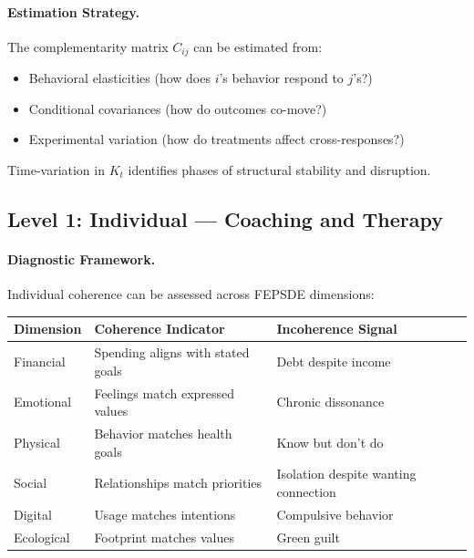 \documentclass[12pt,a4paper]{article}
\begin{document}
\paragraph{Estimation Strategy.}
The complementarity matrix $C_{ij}$ can be estimated from:
\begin{itemize}
  \item Behavioral elasticities (how does $i$'s behavior respond to $j$'s?)
  \item Conditional covariances (how do outcomes co-move?)
  \item Experimental variation (how do treatments affect cross-responses?)
\end{itemize}

Time-variation in $K_t$ identifies phases of structural stability and disruption.

\subsection{Level 1: Individual --- Coaching and Therapy}

\paragraph{Diagnostic Framework.}
Individual coherence can be assessed across FEPSDE dimensions:
\begin{center}
\renewcommand{\arraystretch}{1.2}
\begin{tabular}{lll}
\hline
\textbf{Dimension} & \textbf{Coherence Indicator} & \textbf{Incoherence Signal} \\
\hline
Financial & Spending aligns with stated goals & Debt despite income \\
Emotional & Feelings match expressed values & Chronic dissonance \\
Physical & Behavior matches health goals & Know but don't do \\
Social & Relationships match priorities & Isolation despite wanting connection \\
Digital & Usage matches intentions & Compulsive behavior \\
Ecological & Footprint matches values & Green guilt \\
\hline
\end{tabular}
\end{center}
\end{document}
